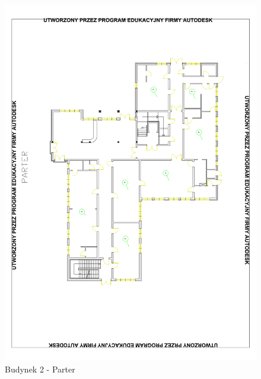 \begin{figure}[H]
  \begin{center}
    \includegraphics[width=\textwidth]{img/b2-0.pdf}
    \caption{Budynek 2 - Parter}
  \end{center}
\end{figure}

